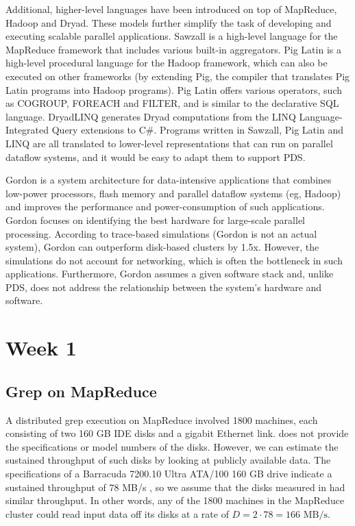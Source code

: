 \documentclass{acm_proc_article-sp}
\begin{document}
Additional, higher-level languages have been introduced on top of MapReduce, Hadoop and Dryad. These models further simplify the task of developing and executing scalable parallel applications. Sawzall \cite{sawzall} is a high-level language for the MapReduce framework that includes various built-in aggregators. Pig Latin \cite{piglatin} is a high-level procedural language for the Hadoop framework, which can also be executed on other frameworks (by extending Pig, the compiler that translates Pig Latin programs into Hadoop programs). Pig Latin offers various operators, such as COGROUP, FOREACH and FILTER, and is similar to the declarative SQL language. DryadLINQ \cite{dryadlinq} generates Dryad computations from the LINQ Language-Integrated Query extensions to C\#. Programs written in Sawzall, Pig Latin and LINQ are all translated to lower-level representations that can run on parallel dataflow systems, and it would be easy to adapt them to support PDS.

Gordon \cite{gordon} is a system architecture for data-intensive applications that combines low-power processors, flash memory and parallel dataflow systems (eg, Hadoop) and improves the performance and power-consumption of such applications. Gordon focuses on identifying the best hardware for large-scale parallel processing. According to trace-based simulations (Gordon is not an actual system), Gordon can outperform disk-based clusters by 1.5x. However, the simulations do not account for networking, which is often the bottleneck in such applications. Furthermore, Gordon assumes a given software stack and, unlike PDS, does not address the relationship between the system's hardware and software.

\section{Week 1}
\subsection{Grep on MapReduce}
A distributed grep execution on MapReduce involved 1800 machines, each consisting of two 160 GB IDE disks and a gigabit Ethernet link. \cite{mapreduce} does not provide the specifications or model numbers of the disks. However, we can estimate the sustained throughput of such disks by looking at publicly available data. The specifications of a Barracuda 7200.10 Ultra ATA/100 160 GB drive indicate a sustained throughput of 78 MB/s \cite{seagate160gb}, so we assume that the disks measured in \cite{mapreduce} had similar throughput. In other words, any of the 1800 machines in the MapReduce cluster could read input data off its disks at a rate of $D = 2 \cdot 78 = 166 \text{ MB/s}$.
\end{document}
